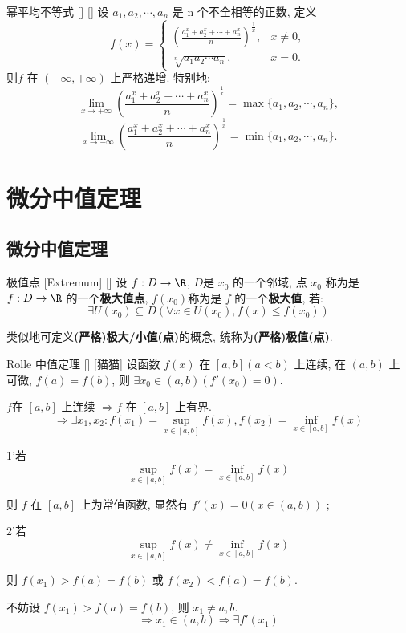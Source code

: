 \documentclass[UTF8]{ctexart}
\begin{document}
			\begin{xmp}
			    []
			    {幂平均不等式}
			    []
			    []
				设 \(a_1, a_2, \cdots, a_n\) 是 n 个不全相等的正数, 定义
                \[f(x) = 
                \begin{cases}
                \left( \frac{a_1^x + a_2^x + \cdots + a_n^x}{n} \right)^{\frac{1}{x}}, & x \neq 0, \\
                \sqrt[n]{a_1 a_2 \cdots a_n}, & x = 0.
                \end{cases}
                \]
                则\(f\) 在 \((-\infty, +\infty)\) 上严格递增.
                特别地: 
                \[
                \lim_{x \to +\infty} \left( \frac{a_1^x + a_2^x + \cdots + a_n^x}{n} \right)^{\frac{1}{x}} = \max\{a_1, a_2, \cdots, a_n\},
                \]
                \[
                \lim_{x \to -\infty} \left( \frac{a_1^x + a_2^x + \cdots + a_n^x}{n} \right)^{\frac{1}{x}} = \min\{a_1, a_2, \cdots, a_n\}.
                \]

			\end{xmp}
		
	\section{微分中值定理}
		
		\subsection{微分中值定理}

			\begin{dfn}
			    []
			    {极值点}
			    [Extremum]
			    []
				设 \(f:D\to\R\), \(D\)是 \(x_0\) 的一个邻域, 点 \(x_0\) 称为是 \(f:D\to\R\) 的一个\textbf{极大值点}, \(f(x_0)\)称为是 \(f\) 的一个\textbf{极大值}, 若: 
				\[\exists U(x_0)\subseteq D(\forall x\in U(x_0), f(x)\leq f(x_0))\]
				
				类似地可定义\textbf{(严格)极大/小值(点)}的概念, 统称为\textbf{(严格)极值(点)}. 
			\end{dfn}
			
			\begin{thm}
			    []
			    {Rolle 中值定理}
			    []
			    [猫猫]
				设函数 \(f(x)\) 在 \([a,b](a<b)\) 上连续, 在 \((a,b)\) 上可微, \(f(a)=f(b)\), 则 \(\exists x_0\in (a,b)(f'(x_0)=0)\). 
			\end{thm}
				
			\begin{prf}
				\(f\)在 \([a,b]\) 上连续 \(\Longrightarrow f\) 在 \([a,b]\) 上有界. 
				\[\Longrightarrow\exists x_1,x_2: f(x_1)=\sup_{x\in[a,b]}f(x), f(x_2)=\inf_{x\in[a,b]}f(x)\]
				
				1'若\[\sup_{x\in[a,b]}f(x)=\inf_{x\in[a,b]}f(x)\]
				
				则 \(f\) 在 \([a,b]\) 上为常值函数, 显然有 \(f'(x)=0(x\in(a,b))\) ; 
				
				2'若\[\sup_{x\in[a,b]}f(x)\neq\inf_{x\in[a,b]}f(x)\]
				
				则 \(f(x_1)>f(a)=f(b)\) 或 \(f(x_2)<f(a)=f(b)\). 
				
				不妨设 \(f(x_1)>f(a)=f(b)\), 则 \(x_1\neq a,b\). 
				\[\Longrightarrow x_1\in (a,b)\Longrightarrow \exists f'(x_1)\]
			\end{prf}
				
\end{document}
